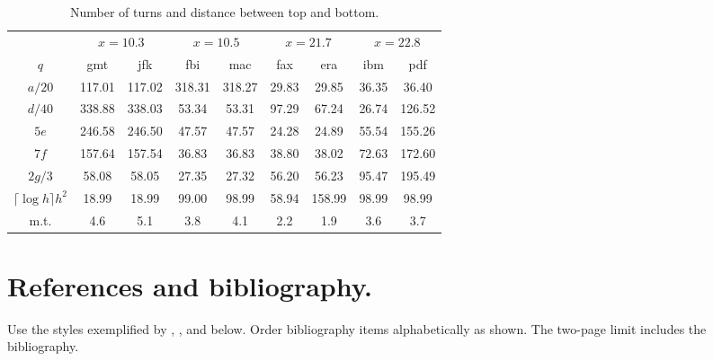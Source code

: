 \documentclass[twoside]{article}
\begin{document}
\begin{table}[h]
\begin{center} {\footnotesize
\begin{tabular}{|c|cc|cc|cc|cc|}
\hline
 & \multicolumn{2}{c|}{$x=10.3$} & \multicolumn{2}{c|}{$x=10.5$} &
\multicolumn{2}{c|}{$x=21.7$} & \multicolumn{2}{c|}{$x=22.8$} \\
$q$  & \multicolumn{1}{c}{gmt} & \multicolumn{1}{c|}{jfk} &
\multicolumn{1}{c}{fbi} & \multicolumn{1}{c|}{mac} & \multicolumn{1}{c}{fax} &
\multicolumn{1}{c|}{era} & \multicolumn{1}{c}{ibm} &
\multicolumn{1}{c|}{pdf}\\\hline
$a/20$ &     117.01 & 117.02  &   318.31 & 318.27  &   29.83 & 29.85    & 36.35
& 36.40 \\
$d/40$  &     338.88 & 338.03  &   53.34 & 53.31  &  97.29 & 67.24 &   26.74 &
126.52 \\
$5e$ &     246.58 & 246.50  &   47.57 & 47.57  &  24.28 & 24.89 &   55.54 &
155.26 \\
$7f$    &     157.64 & 157.54  &   36.83 & 36.83  &  38.80 & 38.02 &   72.63 &
172.60 \\
$2g/3$   &     58.08 & 58.05  &   27.35 & 27.32  &  56.20 & 56.23 &   95.47 &
195.49 \\
$\lceil \log h \rceil h^2$    &     18.99 & 18.99  &   99.00 & 98.99  &  58.94 &
158.99 &   98.99 & 98.99 \\
\hline m.t. &     4.6 &  5.1 &     3.8 &  4.1 &     2.2 & 1.9  &   3.6 &  3.7 \\
\hline
\end{tabular} }
\end{center}
\caption{\footnotesize Number of turns and distance between top and bottom.}
\label{turns}
\end{table}

\section{\large References and bibliography.}

Use the styles exemplified by \cite{HB98}, \cite{CA}, \cite{MSW00} and
\cite{Rei91} below.  Order bibliography items alphabetically as shown.  The
two-page limit includes the bibliography.
\end{document}
